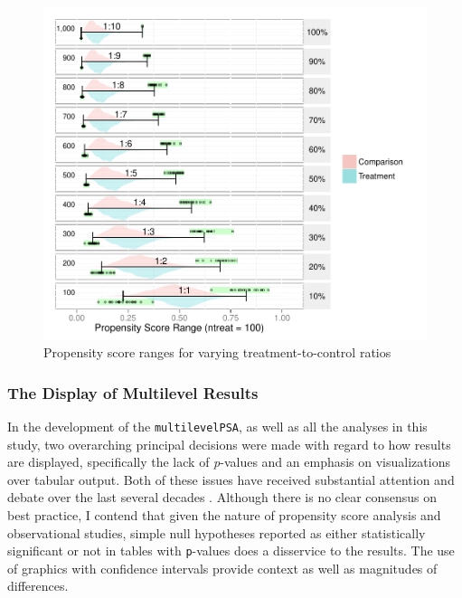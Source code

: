 \documentclass[letterpaper,12p,twoside]{article} %
\begin{document}
\begin{figure}[t]
\begin{center}
\includegraphics[width=\textwidth]{../Figures2009/PSRanges.pdf}
\caption{Propensity score ranges for varying treatment-to-control ratios}
\label{fig:psranges}
\end{center}
\end{figure}

\subsubsection{The Display of Multilevel Results}

In the development of the \texttt{multilevelPSA}, as well as all the analyses in this study, two overarching principal decisions were made with regard to how results are displayed, specifically the lack of \textit{p}-values and an emphasis on visualizations over tabular output. Both of these issues have received substantial attention and debate over the last several decades \cite{Shrout1997,Hunter1997,Harris1997,Abelson1997,Scarr1997,Estes1997}. Although there is no clear consensus on best practice, I contend that given the nature of propensity score analysis and observational studies, simple null hypotheses reported as either statistically significant or not in tables with \texttt{p}-values does a disservice to the results. The use of graphics with confidence intervals provide context as well as magnitudes of differences.
\end{document}
